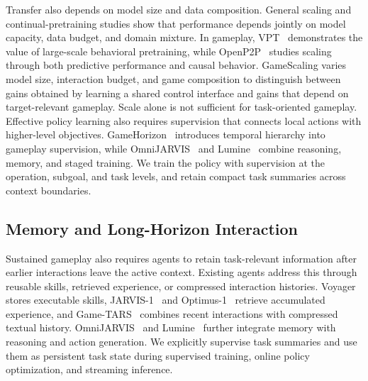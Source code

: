 Transfer also depends on model size and data composition. General scaling and continual-pretraining studies show that performance depends jointly on model capacity, data budget, and domain mixture. In gameplay, VPT~\cite{baker2022vpt} demonstrates the value of large-scale behavioral pretraining, while OpenP2P~\cite{yue2026openp2p} studies scaling through both predictive performance and causal behavior. GameScaling varies model size, interaction budget, and game composition to distinguish between gains obtained by learning a shared control interface and gains that depend on target-relevant gameplay. Scale alone is not sufficient for task-oriented gameplay. Effective policy learning also requires supervision that connects local actions with higher-level objectives. GameHorizon~\cite{wang2026gamehorizon} introduces temporal hierarchy into gameplay supervision, while OmniJARVIS~\cite{wang2024omnijarvis} and Lumine~\cite{tan2025lumine} combine reasoning, memory, and staged training. We train the policy with supervision at the operation, subgoal, and task levels, and retain compact task summaries across context boundaries.


\subsection{Memory and Long-Horizon Interaction}

Sustained gameplay also requires agents to retain task-relevant information after earlier interactions leave the active context. Existing agents address this through reusable skills, retrieved experience, or compressed interaction histories. Voyager stores executable skills, JARVIS-1~\cite{wang2025jarvis1} and Optimus-1~\cite{li2024optimus1} retrieve accumulated experience, and Game-TARS~\cite{wang2025gametars} combines recent interactions with compressed textual history. OmniJARVIS~\cite{wang2024omnijarvis} and Lumine~\cite{tan2025lumine} further integrate memory with reasoning and action generation. We explicitly supervise task summaries and use them as persistent task state during supervised training, online policy optimization, and streaming inference. 

